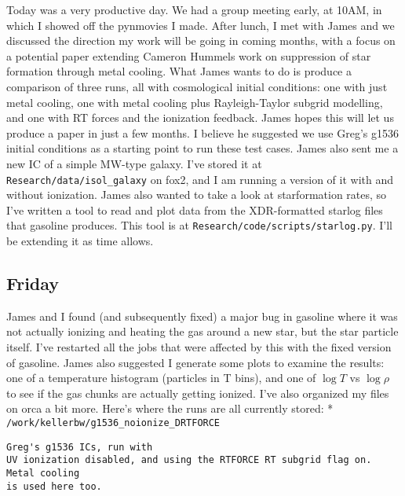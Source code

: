 \documentclass[11pt,letterpaper]{article}
\begin{document}
Today was a very productive day. We had a group meeting early, at 10AM,
in which I showed off the pynmovies I made. After lunch, I met with
James and we discussed the direction my work will be going in coming
months, with a focus on a potential paper extending Cameron Hummels work
on suppression of star formation through metal cooling. What James wants
to do is produce a comparison of three runs, all with cosmological
initial conditions: one with just metal cooling, one with metal cooling
plus Rayleigh-Taylor subgrid modelling, and one with RT forces and the
ionization feedback. James hopes this will let us produce a paper in
just a few months. I believe he suggested we use Greg's g1536 initial
conditions as a starting point to run these test cases. James also sent
me a new IC of a simple MW-type galaxy. I've stored it at
\texttt{Research/data/isol\_galaxy} on fox2, and I am running a version
of it with and without ionization. James also wanted to take a look at
starformation rates, so I've written a tool to read and plot data from
the XDR-formatted starlog files that gasoline produces. This tool is at
\texttt{Research/code/scripts/starlog.py}. I'll be extending it as time
allows.

\subsection{Friday}

James and I found (and subsequently fixed) a major bug in gasoline where
it was not actually ionizing and heating the gas around a new star, but
the star particle itself. I've restarted all the jobs that were affected
by this with the fixed version of gasoline. James also suggested I
generate some plots to examine the results: one of a temperature
histogram (particles in T bins), and one of $\log T$ vs $\log\rho$ to
see if the gas chunks are actually getting ionized. I've also organized
my files on orca a bit more. Here's where the runs are all currently
stored: * \texttt{/work/kellerbw/g1536\_noionize\_DRTFORCE}

\begin{verbatim}
Greg's g1536 ICs, run with
UV ionization disabled, and using the RTFORCE RT subgrid flag on.  Metal cooling
is used here too.
\end{verbatim}
\end{document}
